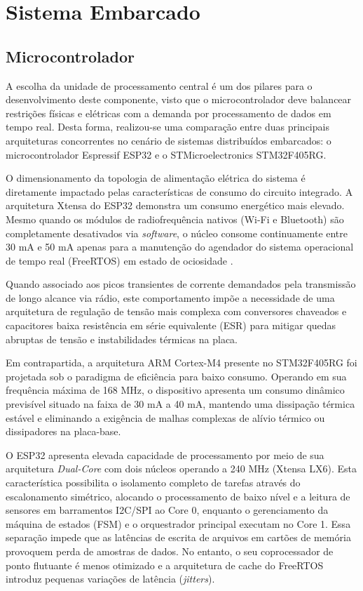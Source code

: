 \chapter{Sistema Embarcado}
\label{cap:sistema-embarcado}

\section{Microcontrolador}
A escolha da unidade de processamento central é um dos pilares para o desenvolvimento deste componente, visto que o microcontrolador deve balancear restrições físicas e elétricas com a demanda por processamento de dados em tempo real. Desta forma, realizou-se uma comparação entre duas principais arquiteturas concorrentes no cenário de sistemas distribuídos embarcados: o microcontrolador Espressif ESP32 e o STMicroelectronics STM32F405RG.

O dimensionamento da topologia de alimentação elétrica do sistema é diretamente impactado pelas características de consumo do circuito integrado. A arquitetura Xtensa do ESP32 demonstra um consumo energético mais elevado. Mesmo quando os módulos de radiofrequência nativos (Wi-Fi e Bluetooth) são completamente desativados via \textit{software}, o núcleo consome continuamente entre 30 mA e 50 mA apenas para a manutenção do agendador do sistema operacional de tempo real (FreeRTOS) em estado de ociosidade \cite{esp32_datasheet}. 

Quando associado aos picos transientes de corrente demandados pela transmissão de longo alcance via rádio, este comportamento impõe a necessidade de uma arquitetura de regulação de tensão mais complexa com conversores chaveados e capacitores baixa resistência em série equivalente (ESR) para mitigar quedas abruptas de tensão e instabilidades térmicas na placa.

Em contrapartida, a arquitetura ARM Cortex-M4 presente no STM32F405RG foi projetada sob o paradigma de eficiência para baixo consumo. Operando em sua frequência máxima de 168 MHz, o dispositivo apresenta um consumo dinâmico previsível situado na faixa de 30 mA a 40 mA, mantendo uma dissipação térmica estável e eliminando a exigência de malhas complexas de alívio térmico ou dissipadores na placa-base. \cite{STM32F405RG_datasheet}

O ESP32 apresenta elevada capacidade de processamento por meio de sua arquitetura \textit{Dual-Core} com dois núcleos operando a 240 MHz (Xtensa LX6). Esta característica possibilita o isolamento completo de tarefas através do escalonamento simétrico, alocando o processamento de baixo nível e a leitura de sensores em barramentos I2C/SPI ao Core 0, enquanto o gerenciamento da máquina de estados (FSM) e o orquestrador principal executam no Core 1. Essa separação impede que as latências de escrita de arquivos em cartões de memória provoquem perda de amostras de dados. No entanto, o seu coprocessador de ponto flutuante é menos otimizado e a arquitetura de cache do FreeRTOS introduz pequenas variações de latência (\textit{jitters}).


